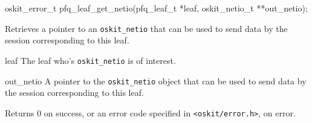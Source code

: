 \begin{apisyn}

	\funcproto oskit_error_t pfq_leaf_get_netio(pfq_leaf_t *leaf,
				oskit_netio_t **out_netio);
\end{apisyn}
\begin{apidesc}
	Retrieves a pointer to an \texttt{oskit_netio} that can be
	used to send data by the session corresponding to this leaf.
\end{apidesc}
\begin{apiparm}
	\item[leaf]
		The leaf who's \texttt{oskit_netio} is of interest.
	\item[out_netio]
		A pointer to the \texttt{oskit_netio} object that can
		be used to send data by the session corresponding to
		this leaf.
\end{apiparm}
\begin{apiret}
	Returns 0 on success, or an error code specified in
	\texttt{<oskit/error.h>}, on error.
\end{apiret}
